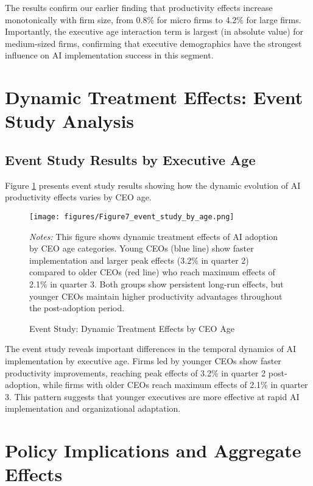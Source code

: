 \documentclass[12pt, a4paper]{article}
\begin{document}
The results confirm our earlier finding that productivity effects increase monotonically with firm size, from 0.8\% for micro firms to 4.2\% for large firms. Importantly, the executive age interaction term is largest (in absolute value) for medium-sized firms, confirming that executive demographics have the strongest influence on AI implementation success in this segment.

\section{Dynamic Treatment Effects: Event Study Analysis}

\subsection{Event Study Results by Executive Age}

Figure \ref{fig:event_study_by_age} presents event study results showing how the dynamic evolution of AI productivity effects varies by CEO age.

\begin{figure}[H]
\centering
\texttt{[image: figures/Figure7\_event\_study\_by\_age.png]}
\caption{Event Study: Dynamic Treatment Effects by CEO Age}
\label{fig:event_study_by_age}
\begin{minipage}{\textwidth}
\footnotesize
\textit{Notes:} This figure shows dynamic treatment effects of AI adoption by CEO age categories. Young CEOs (blue line) show faster implementation and larger peak effects (3.2\% in quarter 2) compared to older CEOs (red line) who reach maximum effects of 2.1\% in quarter 3. Both groups show persistent long-run effects, but younger CEOs maintain higher productivity advantages throughout the post-adoption period.
\end{minipage}
\end{figure}

The event study reveals important differences in the temporal dynamics of AI implementation by executive age. Firms led by younger CEOs show faster productivity improvements, reaching peak effects of 3.2\% in quarter 2 post-adoption, while firms with older CEOs reach maximum effects of 2.1\% in quarter 3. This pattern suggests that younger executives are more effective at rapid AI implementation and organizational adaptation.

\section{Policy Implications and Aggregate Effects}
\end{document}
